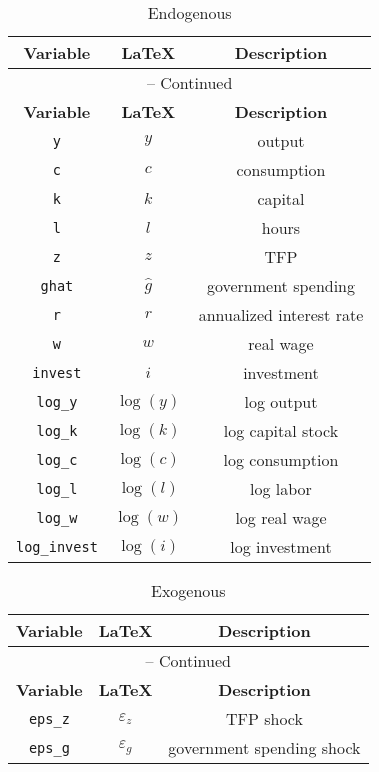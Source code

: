 \begin{center}
\begin{longtable}{ccc}
\caption{Endogenous}\\%
\hline%
\multicolumn{1}{c}{\textbf{Variable}} &
\multicolumn{1}{c}{\textbf{\LaTeX}} &
\multicolumn{1}{c}{\textbf{Description}}\\%
\hline\hline%
\endfirsthead
\multicolumn{3}{c}{{\tablename} \thetable{} -- Continued}\\%
\hline%
\multicolumn{1}{c}{\textbf{Variable}} &
\multicolumn{1}{c}{\textbf{\LaTeX}} &
\multicolumn{1}{c}{\textbf{Description}}\\%
\hline\hline%
\endhead
\texttt{y} & ${y}$ & output\\
\texttt{c} & ${c}$ & consumption\\
\texttt{k} & ${k}$ & capital\\
\texttt{l} & ${l}$ & hours\\
\texttt{z} & ${z}$ & TFP\\
\texttt{ghat} & ${\hat g}$ & government spending\\
\texttt{r} & ${r}$ & annualized interest rate\\
\texttt{w} & ${w}$ & real wage\\
\texttt{invest} & ${i}$ & investment\\
\texttt{log\_y} & ${\log(y)}$ & log output\\
\texttt{log\_k} & ${\log(k)}$ & log capital stock\\
\texttt{log\_c} & ${\log(c)}$ & log consumption\\
\texttt{log\_l} & ${\log(l)}$ & log labor\\
\texttt{log\_w} & ${\log(w)}$ & log real wage\\
\texttt{log\_invest} & ${\log(i)}$ & log investment\\
\hline%
\end{longtable}
\end{center}
\begin{center}
\begin{longtable}{ccc}
\caption{Exogenous}\\%
\hline%
\multicolumn{1}{c}{\textbf{Variable}} &
\multicolumn{1}{c}{\textbf{\LaTeX}} &
\multicolumn{1}{c}{\textbf{Description}}\\%
\hline\hline%
\endfirsthead
\multicolumn{3}{c}{{\tablename} \thetable{} -- Continued}\\%
\hline%
\multicolumn{1}{c}{\textbf{Variable}} &
\multicolumn{1}{c}{\textbf{\LaTeX}} &
\multicolumn{1}{c}{\textbf{Description}}\\%
\hline\hline%
\endhead
\texttt{eps\_z} & ${\varepsilon_z}$ & TFP shock\\
\texttt{eps\_g} & ${\varepsilon_g}$ & government spending shock\\
\hline%
\end{longtable}
\end{center}
